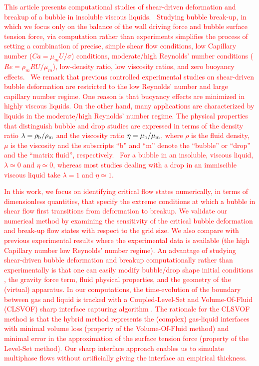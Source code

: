 \documentclass{elsarticle}
\begin{document}
\textcolor{red} {
	This article presents computational studies of shear-driven deformation and breakup of a bubble in insoluble viscous liquids.  Studying bubble break-up, in which we focus only on the balance of the wall driving force and bubble surface tension force, via computation rather than experiments simplifies the process of setting a combination of precise, simple shear flow conditions, low Capillary number ($Ca=\mu_{m}U/\sigma$) conditions, moderate/high Reynolds' number conditions ($Re=\rho_{m} R U/\mu_{m}$), low-density ratio, low viscosity ratios, and zero buoyancy effects.  We remark that previous controlled experimental studies on shear-driven bubble deformation are restricted to the low Reynolds' number and large capillary number regime\cite{RusMan02,CanedoETAL}.  One reason is that buoyancy effects are minimized in highly viscous liquids.  On the other hand, many applications are characterized by liquids in the moderate/high Reynolds' number regime.  The physical properties that distinguish bubble and drop studies are expressed in terms of the density ratio $\lambda = \rho_{\rm b} / \rho_{\rm m}$ and the viscosity ratio $\eta = \mu_{\rm b} / \mu_{\rm m}$, where $\rho$ is the fluid density, $\mu$ is the viscosity and the subscripts ``b'' and ``m'' denote the ``bubble'' or ``drop'' and the ``matrix fluid'', respectively.  For a bubble in an insoluble, viscous liquid, $\lambda \simeq 0$ and $\eta \simeq 0$, whereas most studies dealing with a drop in an immiscible viscous liquid take $\lambda =1$ and $\eta \simeq 1$.  
}
\par
\textcolor{red} {
	In this work, we focus on identifying critical flow states numerically, in terms of dimensionless quantities, that specify the extreme conditions at which a bubble in shear flow first transitions from deformation to breakup.  We validate our numerical method by examining the sensitivity of the critical bubble deformation and break-up flow states with respect to the grid size.  We also compare with previous experimental results where the experimental data is available (the high Capillary number low Reynolds' number regime).  An advantage of studying shear-driven bubble deformation and breakup computationally rather than experimentally is that one can easily modify bubble/drop shape initial conditions \cite{ohta2005computational}, the gravity force term\cite{hoyt2013performance}, fluid physical properties, and the geometry of the (virtual) apparatus\cite{FRENSE2024120579}.  In our computations, the time-evolution of the boundary between gas and liquid is tracked with a Coupled-Level-Set and Volume-Of-Fluid (CLSVOF) sharp interface capturing algorithm \cite{SusPuc00,SusSmiHusOhtZhi07}.  The rationale for the CLSVOF method is that the hybrid method represents the (complex) gas-liquid interfaces with minimal volume loss (property of the Volume-Of-Fluid method) and minimal error in the approximation of the surface tension force (property of the Level-Set method).  Our sharp interface approach\cite{SusSmiHusOhtZhi07,Sus03,KanFedLiu00} enables us to simulate multiphase flows without artificially giving the interface an empirical thickness.
}
\end{document}

